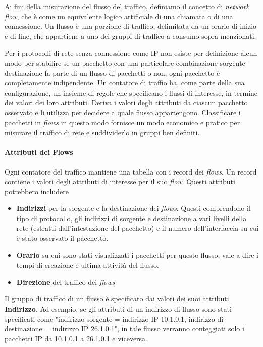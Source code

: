 \documentclass[../main.tex]{subfiles}
\begin{document}
Ai fini della misurazione del flusso del traffico, definiamo il concetto di \textit{network flow}, che è come un equivalente logico artificiale di una chiamata o di una connessione. Un flusso è una porzione di traffico, delimitata da un orario di inizio e di fine, che appartiene a uno dei gruppi di traffico a consumo sopra menzionati. 

Per i protocolli di rete senza connessione come IP non esiste per definizione alcun modo per stabilire se un pacchetto con una particolare combinazione sorgente - destinazione fa parte di un flusso di pacchetti o non, ogni pacchetto è completamente indipendente. Un contatore di traffio ha, come parte della sua configurazione, un insieme di regole che specificano i flussi di interesse, in termine dei valori dei loro attributi. Deriva i valori degli attributi da ciascun pacchetto osservato e li utilizza per decidere a quale flusso appartengono. Classificare i pacchetti in \textit{flows} in questo modo fornisce un modo economico e pratico per misurare il traffico di rete e suddividerlo in gruppi ben definiti.

\paragraph{Attributi dei Flows}
Ogni contatore del traffico mantiene una tabella con i record dei \textit{flows}. Un record contiene i valori degli attributi di interesse per il suo \textit{flow}. Questi attributi potrebbero includere
\begin{itemize}
				\item \textbf{Indirizzi} per la sorgente e la destinazione dei \textit{flows}. Questi comprendono il tipo di protocollo, gli indirizzi di sorgente e destinazione a vari livelli della rete (estratti dall'intestazione del pacchetto) e il numero dell'interfaccia su cui è stato osservato il pacchetto.
				\item \textbf{Orario} su cui sono stati visualizzati i pacchetti per questo flusso, vale a dire i tempi di creazione e ultima attività del flusso.
				\item \textbf{Direzione} del traffico dei \textit{flows} 
\end{itemize}


Il gruppo di traffico di un flusso è specificato dai valori dei suoi attributi \textbf{Indirizzo}. Ad esempio, se gli attributi di un indirizzo di flusso sono stati specificati come "indirizzo sorgente = indirizzo IP 10.1.0.1, indirizzo di destinazione = indirizzo IP 26.1.0.1", in tale flusso verranno conteggiati solo i pacchetti IP da 10.1.0.1 a 26.1.0.1 e viceversa.
\end{document}

